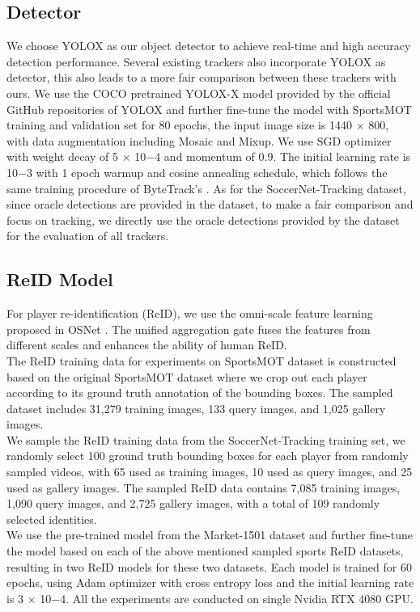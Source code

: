 \documentclass[10pt,twocolumn,letterpaper]{article}
\begin{document}
\subsection{Detector}
We choose YOLOX \cite{YOLOX} as our object detector to achieve real-time and high accuracy detection performance. Several existing trackers \cite{ByteTrack,OCSORT,aharon2022bot,yang2023hard} also incorporate YOLOX as detector, this also leads to a more fair comparison between these trackers with ours. We use the COCO pretrained YOLOX-X model provided by the official GitHub repositories of YOLOX \cite{YOLOX} and further fine-tune the model with SportsMOT training and validation set for 80 epochs, the input image size is 1440 $\times$ 800, with data augmentation including Mosaic and Mixup. We use SGD optimizer with weight decay of 5 $\times$ 10$-$4 and momentum of 0.9. The initial learning rate is 10$-$3 with 1 epoch warmup and cosine annealing schedule, which follows the same training procedure of ByteTrack's \cite{ByteTrack}. As for the SoccerNet-Tracking dataset, since oracle detections are provided in the dataset, to make a fair comparison and focus on tracking, we directly use the oracle detections provided by the dataset for the evaluation of all trackers.

\subsection{ReID Model}



For player re-identification (ReID), we use the omni-scale feature learning proposed in OSNet \cite{OSNet}. The unified aggregation gate fuses the features from different scales and enhances the ability of human ReID. \\
 The ReID training data for experiments on SportsMOT dataset is constructed based on the original SportsMOT dataset where we crop out each player according to its ground truth annotation of the bounding boxes. The sampled dataset includes 31,279 training images, 133 query images, and 1,025 gallery images. \\
 We sample the ReID training data from the SoccerNet-Tracking training set, we randomly select 100 ground truth bounding boxes for each player from randomly sampled videos, with 65 used as training images, 10 used as query images, and 25 used as gallery images. The sampled ReID data contains 7,085 training images, 1,090 query images, and 2,725 gallery images, with a total of 109 randomly selected identities.\\
 We use the pre-trained model from the Market-1501 dataset \cite{zheng2015scalable} and further fine-tune the model based on each of the above mentioned sampled sports ReID datasets, resulting in two ReID models for these two datasets. Each model is trained for 60 epochs, using Adam optimizer with cross entropy loss and the initial learning rate is 3 $\times$ 10$-$4. All the experiments are conducted on single Nvidia RTX 4080 GPU.\\  
\end{document}

